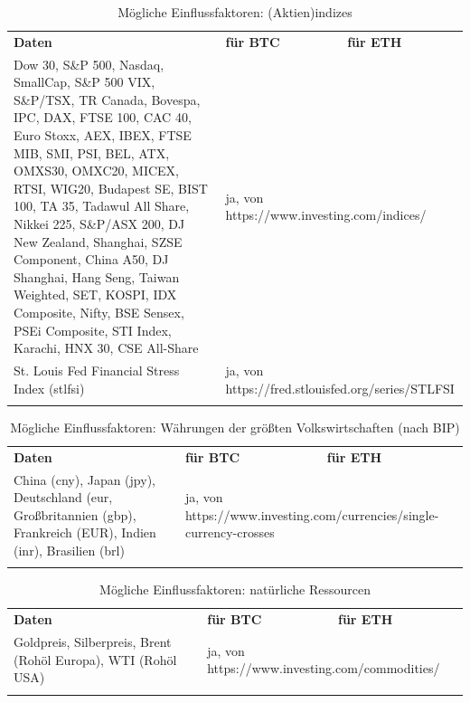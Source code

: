 \begin{centering} \footnotesize \begin{longtable}[H]{|p{9cm}|p{}|p{}|}
\hline
\textbf{Daten} & \textbf{für BTC} & \textbf{für ETH} \\
\hhline{===}
Dow 30, S\&P 500, Nasdaq, SmallCap, S\&P 500 VIX, S\&P/TSX, TR Canada, Bovespa, IPC, DAX, FTSE 100, CAC 40, Euro Stoxx, AEX, IBEX, FTSE MIB, SMI, PSI, BEL, ATX, OMXS30, OMXC20, MICEX, RTSI, WIG20, Budapest SE, BIST 100, TA 35, Tadawul All Share, Nikkei 225, S\&P/ASX 200, DJ New Zealand, Shanghai, SZSE Component, China A50, DJ Shanghai, Hang Seng, Taiwan Weighted, SET, KOSPI, IDX Composite, Nifty, BSE Sensex, PSEi Composite, STI Index, Karachi, HNX 30, CSE All-Share	& \multicolumn{2}{p{7cm}|}{ja, von https://www.investing.com/indices/}\\ \hline
St. Louis Fed Financial Stress Index (\gls{stlfsi}) & \multicolumn{2}{p{7cm}|}{ja, von https://fred.stlouisfed.org/series/STLFSI}\\ \hline
\caption{Mögliche Einflussfaktoren: (Aktien)indizes}
\end{longtable} 
\end{centering}

\begin{centering} \footnotesize \begin{longtable}[H]{|p{7cm}|p{}|p{}|}
\hline
\textbf{Daten} & \textbf{für BTC} & \textbf{für ETH} \\
\hhline{===}
China (\gls{cny}), Japan (\gls{jpy}), Deutschland (\gls{eur}, Großbritannien  (\gls{gbp}), Frankreich (EUR), Indien (\gls{inr}), Brasilien (\gls{brl}) & \multicolumn{2}{p{9cm}|}{ja, von https://www.investing.com/currencies/single-currency-crosses}\\ \hline
\caption{Mögliche Einflussfaktoren: Währungen der größten Volkswirtschaften (nach BIP)}
\end{longtable} 
\end{centering}

\begin{centering} \footnotesize \begin{longtable}[H]{|p{7cm}|p{}|p{}|}
\hline
\textbf{Daten} & \textbf{für BTC} & \textbf{für ETH} \\
\hhline{===}
Goldpreis, Silberpreis, Brent (Rohöl Europa), WTI (Rohöl USA) & \multicolumn{2}{p{9cm}|}{ja, von https://www.investing.com/commodities/}\\ \hline
\caption{Mögliche Einflussfaktoren: natürliche Ressourcen}
\label{tab:dataToAnalyseE}
\end{longtable} \end{centering}

